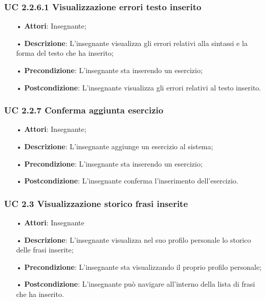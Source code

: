 \subsubsection{UC 2.2.6.1 Visualizzazione errori testo inserito}
\begin{itemize}
	\item[•] \textbf{Attori}: Insegnante;
	\item[•] \textbf{Descrizione}: L'insegnante visualizza gli errori relativi alla sintassi e la forma del testo che ha inserito;
	\item[•] \textbf{Precondizione}: L'insegnante sta inserendo un esercizio;
	\item[•] \textbf{Postcondizione}: L’insegnante visualizza gli errori relativi al testo inserito.
\end{itemize}

\subsubsection{UC 2.2.7 Conferma aggiunta esercizio}
\begin{itemize}
	\item[•] \textbf{Attori}: Insegnante;
	\item[•] \textbf{Descrizione}: L'insegnante aggiunge un esercizio al sistema;
	\item[•] \textbf{Precondizione}: L’insegnante sta inserendo un esercizio;
	\item[•] \textbf{Postcondizione}: L'insegnante conferma l'inserimento dell'esercizio.
\end{itemize}






\subsubsection{UC 2.3 Visualizzazione storico frasi inserite}


\begin{itemize}
	\item[•] \textbf{Attori}: Insegnante	   
	\item[•] \textbf{Descrizione}: L’insegnante visualizza nel suo profilo personale lo storico delle frasi inserite; 
	\item[•] \textbf{Precondizione}: L'insegnante sta visualizzando il proprio profilo personale;
	\item[•] \textbf{Postcondizione}: L’insegnante può navigare all’interno della lista di frasi che ha inserito.
\end{itemize}

